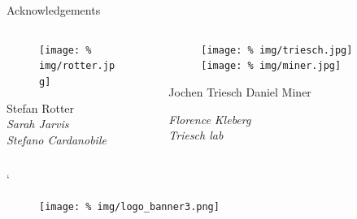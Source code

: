 \begin{frame}{Acknowledgements}
  \vspace{0.95cm}
  \begin{columns}
    \begin{column}{.33\textwidth}
      \minipage[c][0.3\textheight][s]{\columnwidth}
      
      \begin{figure}
        \centering
        \texttt{[image: \%
          img/rotter.jpg]} %
      \end{figure}
      \begin{center}
        Stefan Rotter\\[0.62cm]
        
        \itshape
        Sarah Jarvis\\
        Stefano Cardanobile
        
      \end{center}
      
      
      \endminipage      
    \end{column}
    \begin{column}{.49\textwidth}
      \minipage[c][0.3\textheight][s]{\columnwidth}
            \begin{figure}
        \centering
        \texttt{[image: \%
          img/triesch.jpg]} %
       \hfill
        \texttt{[image: \%
          img/miner.jpg]} %
      \end{figure}
      Jochen Triesch \hfill Daniel Miner \\[0.1cm]

      \begin{center}
        \itshape
        Florence Kleberg\\
        Triesch lab
      \end{center}

     
      \endminipage           
    \end{column}
  \end{columns}


  \vspace{2.5cm}
  `
  \begin{figure}
    \centering
    \texttt{[image: \%
      img/logo\_banner3.png]} %
  \end{figure}

  
\end{frame}
